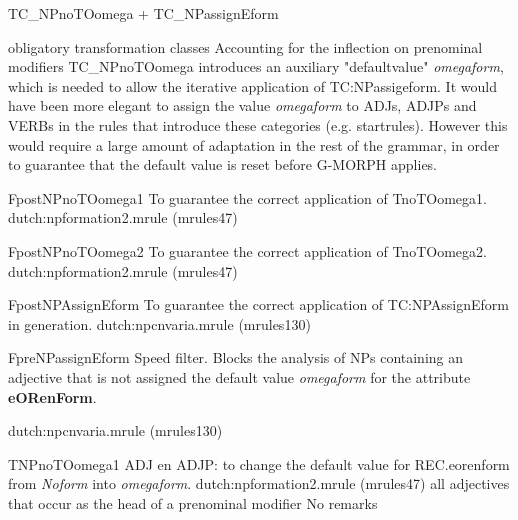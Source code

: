 \begin{mruleclass}{TC\_NPnoTOomega + TC\_NPassignEform} 
\begin{classdescr}
\kind obligatory transformation classes
\classtask Accounting for the inflection on prenominal modifiers
\classremarks
TC\_NPnoTOomega introduces an auxiliary "defaultvalue" {\em omegaform}, 
which is needed 
to allow the iterative application of TC:NPassigeform. 
It would have been more elegant to assign the value {\em omegaform}
to ADJs, ADJPs and VERBs in the rules that introduce these categories 
(e.g. startrules). However this would require a large amount 
of adaptation in the 
rest of the grammar, in order to guarantee that the default value is reset 
before G-MORPH applies. 

\begin{filters}
\begin{members}
\begin{member}
 FpostNPnoTOomega1
To guarantee the correct application of TnoTOomega1.
\file dutch:npformation2.mrule (mrules47)
\end{member}
\begin{member}
 FpostNPnoTOomega2
To guarantee the correct application of TnoTOomega2.
\file dutch:npformation2.mrule (mrules47)
\end{member}

\begin{member}
 FpostNPAssignEform
 To guarantee the correct application of TC:NPAssignEform in 
generation.
\file dutch:npcnvaria.mrule (mrules130)
\end{member}
\end{members}
\end{filters}
\begin{speedrules}
\begin{members}
\begin{member}
 FpreNPassignEform 
  Speed filter. Blocks the analysis of NPs containing an
adjective that is not assigned the default value {\em omegaform} for
the attribute {\bf eORenForm}.

\file dutch:npcnvaria.mrule (mrules130)
\end{member}
\end{members}
\end{speedrules}
\noplannedrules
\norulesnotince
\begin{comments}
\end{comments}
\end{classdescr}
\begin{members}
\begin{member}
 TNPnoTOomega1
 ADJ en ADJP: 
to change the default value for REC.eorenform from {\em Noform}
into {\em omegaform}.
\file dutch:npformation2.mrule (mrules47)
\semantics \nosemantics
\example all adjectives that occur as the head of a 
prenominal modifier
\remarks No remarks


\end{member}
\end{members}
\end{mruleclass}
